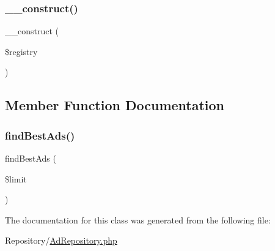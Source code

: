 \subsubsection{\texorpdfstring{\_\_construct()}{\_\_construct()}}
{\footnotesize\ttfamily \+\_\+\+\_\+construct (\begin{DoxyParamCaption}\item[{Registry\+Interface}]{\$registry }\end{DoxyParamCaption})}



\subsection{Member Function Documentation}
\mbox{\label{class_app_1_1_repository_1_1_ad_repository_ad584897206651b14c3ccfc97ad085f25}} 
\subsubsection{\texorpdfstring{findBestAds()}{findBestAds()}}
{\footnotesize\ttfamily find\+Best\+Ads (\begin{DoxyParamCaption}\item[{}]{\$limit }\end{DoxyParamCaption})}



The documentation for this class was generated from the following file\+:\begin{DoxyCompactItemize}
\item 
Repository/\mbox{\hyperlink{_ad_repository_8php}{Ad\+Repository.\+php}}\end{DoxyCompactItemize}
